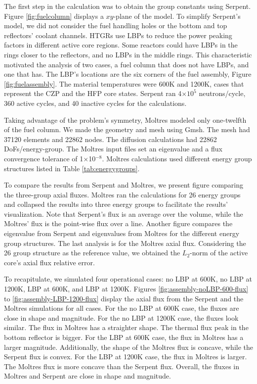 \documentclass[11pt,letterpaper]{article}
\begin{document}
The first step in the calculation was to obtain the group constants using Serpent.
Figure \ref{fig:fuelcolumn} displays a $xy$-plane of the model.
To simplify Serpent's model, we did not consider the fuel handling holes or the bottom and top reflectors' coolant channels.
\glspl{HTGR} use \glspl{LBP} to reduce the power peaking factors in different active core regions.
Some reactors could have \glspl{LBP} in the rings closer to the reflectors, and no \glspl{LBP} in the middle rings.
This characteristic motivated the analysis of two cases, a fuel column that does not have \glspl{LBP}, and one that has.
The LBP's locations are the six corners of the fuel assembly, Figure \ref{fig:fuelassembly}.
The material temperatures were 600K and 1200K, cases that represent the \gls{CZP} and the \gls{HFP} core states.
Serpent ran 4$\times 10^5$ neutrons/cycle, 360 active cycles, and 40 inactive cycles for the calculations.

Taking advantage of the problem's symmetry, Moltres modeled only one-twelfth of the fuel column.
We made the geometry and mesh using Gmsh.
The mesh had 37120 elements and 22862 nodes.
The diffusion calculations had 22862 \glspl{DoF}/energy-group.
The Moltres input files set an eigenvalue and a flux convergence tolerance of 1$\times$10$^{-8}$.
Moltres calculations used different energy group structures listed in Table \ref{tab:energygroups}.

To compare the results from Serpent and Moltres, we present figure comparing the three-group axial fluxes.
Moltres ran the calculations for 26 energy groups and collapsed the results into three energy groups to facilitate the results' visualization.
Note that Serpent's flux is an average over the volume, while the Moltres' flux is the point-wise flux over a line.
Another figure compares the eigenvalue from Serpent and eigenvalues from Moltres for the different energy group structures.
The last analysis is for the Moltres axial flux.
Considering the 26 group structure as the reference value, we obtained the $L_2$-norm of the active core's axial flux relative error.

To recapitulate, we simulated four operational cases: no \gls{LBP} at 600K, no \gls{LBP} at 1200K, \gls{LBP} at 600K, and \gls{LBP} at 1200K.
Figures \ref{fig:assembly-noLBP-600-flux} to \ref{fig:assembly-LBP-1200-flux} display the axial flux from the Serpent and the Moltres simulations for all cases.
For the no LBP at 600K case, the fluxes are close in shape and magnitude.
For the no LBP at 1200K case, the fluxes look similar.
The flux in Moltres has a straighter shape.
The thermal flux peak in the bottom reflector is bigger.
For the LBP at 600K case, the flux in Moltres has a larger magnitude.
Additionally, the shape of the Moltres flux is concave, while the Serpent flux is convex.
For the LBP at 1200K case, the flux in Moltres is larger.
The Moltres flux is more concave than the Serpent flux.
Overall, the fluxes in Moltres and Serpent are close in shape and magnitude.
\end{document}

